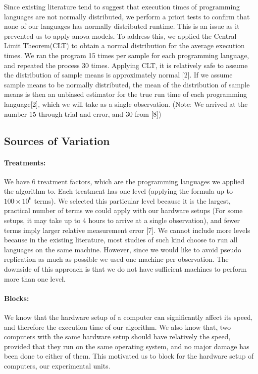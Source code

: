 \documentclass[12pt,halfline,a4paper,]{ouparticle}
\begin{document}
Since existing literature tend to suggest that execution times of
programming languages are not normally distributed, we perform a priori
tests to confirm that none of our languages has normally distributed
runtime. This is an issue as it prevented us to apply anova models. To
address this, we applied the Central Limit Theorem(CLT) to obtain a
normal distribution for the average execution times. We ran the program
15 times per sample for each programming language, and repeated the
process 30 times. Applying CLT, it is relatively safe to assume the
distribution of sample means is approximately normal {[}2{]}. If we
assume sample means to be normally distributed, the mean of the
distribution of sample means is then an unbiased estimator for the true
run time of each programming language{[}2{]}, which we will take as a
single observation. (Note: We arrived at the number 15 through trial and
error, and 30 from {[}8{]})

\subsection{Sources of Variation}\label{sources-of-variation}

\paragraph{Treatments:}\label{treatments}

We have 6 treatment factors, which are the programming languages we
applied the algorithm to. Each treatment has one level (applying the
formula up to \(100 \times 10^6\) terms). We selected this particular
level because it is the largest, practical number of terms we could
apply with our hardware setups (For some setups, it may take up to 4
hours to arrive at a single observation), and fewer terms imply larger
relative measurement error {[}7{]}. We cannot include more levels
because in the existing literature, most studies of such kind choose to
run all languages on the same machine. However, since we would like to
avoid pseudo replication as much as possible we used one machine per
observation. The downside of this approach is that we do not have
sufficient machines to perform more than one level.

\paragraph{Blocks:}\label{blocks}

We know that the hardware setup of a computer can significantly affect
its speed, and therefore the execution time of our algorithm. We also
know that, two computers with the same hardware setup should have
relatively the speed, provided that they run on the same operating
system, and no major damage has been done to either of them. This
motivated us to block for the hardware setup of computers, our
experimental units.
\end{document}

